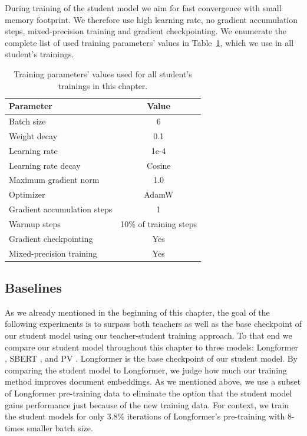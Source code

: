 During training of the student model we aim for fast convergence with small
memory footprint. We therefore use high learning rate, no gradient accumulation
steps, mixed-precision training and gradient checkpointing. We enumerate the
complete list of used training parameters' values in
Table~\ref{table:student_train_params}, which we use in all student's
trainings.


\begin{table}
  \centering
  \footnotesize

  \begin{tabular}{l c}
    \toprule
    Parameter & Value \\
    \midrule
    Batch size & 6 \\
    Weight decay & 0.1 \\
    Learning rate & 1e-4 \\
    Learning rate decay & Cosine \\
    Maximum gradient norm & 1.0 \\
    Optimizer & AdamW \\
    Gradient accumulation steps & 1 \\
    Warmup steps & 10\% of training steps \\
    Gradient checkpointing & Yes \\
    Mixed-precision training & Yes \\
    \bottomrule
  \end{tabular}

  \caption{Training parameters' values used for all student's trainings in this
  chapter.}

  \label{table:student_train_params}

\end{table}

\subsection{Baselines}

As we already mentioned in the beginning of this chapter, the goal of the
following experiments is to surpass both teachers as well as the base
checkpoint of our student model using our teacher-student training approach. To
that end we compare our student model throughout this chapter to three models:
Longformer \citep{beltagy2020longformer}, SBERT \citep{reimers2019sentence},
and PV \citep{le2014distributed}. Longformer is the base checkpoint of our
student model. By comparing the student model to Longformer, we judge how much
our training method improves document embeddings. As we mentioned above, we use
a subset of Longformer pre-training data to eliminate the option that the
student model gains performance just because of the new training data. For
context, we train the student models for only 3.8\% iterations of Longformer's
pre-training with 8-times smaller batch size.


